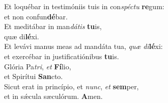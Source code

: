 \evenverse Et loquébar in testimóniis tuis in con\textit{spé}\textit{ctu} \textbf{re}gum:~\*\\
\evenverse et non confun\textbf{dé}bar.\\
\oddverse Et meditábar in man\textit{dá}\textit{tis} \textbf{tu}is,~\*\\
\oddverse quæ di\textbf{lé}xi.\\
\evenverse Et levávi manus meas ad mandáta tua, \textit{quæ} \textit{di}\textbf{lé}xi:~\*\\
\evenverse et exercébar in justificatiónibus \textbf{tu}is.\\
\oddverse Glória Pa\textit{tri}, \textit{et} \textbf{Fí}lio,~\*\\
\oddverse et Spirítui \textbf{San}cto.\\
\evenverse Sicut erat in princípio, et \textit{nunc}, \textit{et} \textbf{sem}per,~\*\\
\evenverse et in sǽcula sæculórum. \textbf{A}men.\\
